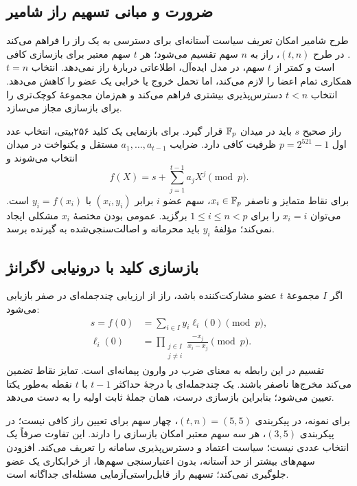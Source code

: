 \subsection{ضرورت و مبانی تسهیم راز شامیر}
طرح شامیر امکان تعریف سیاست آستانه‌ای برای دسترسی به یک راز را فراهم می‌کند \cite{shamir}. در طرح $(t,n)$، راز به $n$ سهم تقسیم می‌شود؛ هر $t$ سهم معتبر برای بازسازی کافی است و کمتر از $t$ سهم، در مدل ایده‌آل، اطلاعاتی دربارۀ راز نمی‌دهد. انتخاب $t=n$ همکاری تمام اعضا را لازم می‌کند، اما تحمل خروج یا خرابی یک عضو را کاهش می‌دهد. انتخاب $t<n$ دسترس‌پذیری بیشتری فراهم می‌کند و هم‌زمان مجموعۀ کوچک‌تری را برای بازسازی مجاز می‌سازد.

راز صحیح $s$ باید در میدان $\mathbb{F}_p$ قرار گیرد. برای بازنمایی یک کلید ۲۵۶بیتی، انتخاب عدد اول $p=2^{521}-1$ ظرفیت کافی دارد. ضرایب $a_1,\ldots,a_{t-1}$ مستقل و یکنواخت در میدان انتخاب می‌شوند و
\begin{equation}
f(X)=s+\sum_{j=1}^{t-1}a_jX^j\pmod p.
\label{eq:shamir-polynomial}
\end{equation}
برای نقاط متمایز و ناصفر $x_i\in\mathbb{F}_p$، سهم عضو $i$ برابر $(x_i,y_i)$ با $y_i=f(x_i)$ است. می‌توان $x_i=i$ را برای $1\le i\le n<p$ برگزید. عمومی بودن مختصۀ $x_i$ مشکلی ایجاد نمی‌کند؛ مؤلفۀ $y_i$ باید محرمانه و اصالت‌سنجی‌شده به گیرنده برسد.

\subsection{بازسازی کلید با درونیابی لاگرانژ}
اگر $I$ مجموعۀ $t$ عضو مشارکت‌کننده باشد، راز از ارزیابی چندجمله‌ای در صفر بازیابی می‌شود:
\begin{align}
s=f(0)&=\sum_{i\in I}y_i\ell_i(0)\pmod p,\\
\ell_i(0)&=\prod_{\substack{j\in I\\j\ne i}}
\frac{-x_j}{x_i-x_j}\pmod p.
\label{eq:lagrange-reconstruction}
\end{align}
تقسیم در این رابطه به معنای ضرب در وارون پیمانه‌ای است. تمایز نقاط تضمین می‌کند مخرج‌ها ناصفر باشند. یک چندجمله‌ای با درجۀ حداکثر $t-1$ با $t$ نقطه به‌طور یکتا تعیین می‌شود؛ بنابراین بازسازی درست، همان جملۀ ثابت اولیه را به دست می‌دهد.

برای نمونه، در پیکربندی $(t,n)=(5,5)$، چهار سهم برای تعیین راز کافی نیست؛ در پیکربندی $(3,5)$، هر سه سهم معتبر امکان بازسازی را دارند. این تفاوت صرفاً یک انتخاب عددی نیست؛ سیاست اعتماد و دسترس‌پذیری سامانه را تعریف می‌کند. افزودن سهم‌های بیشتر از حد آستانه، بدون اعتبارسنجی سهم‌ها، از خرابکاری یک عضو جلوگیری نمی‌کند؛ تسهیم راز قابل‌راستی‌آزمایی مسئله‌ای جداگانه است.

